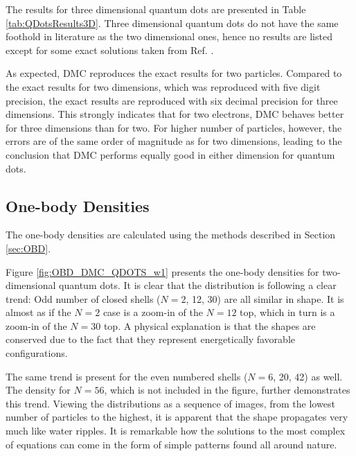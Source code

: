 The results for three dimensional quantum dots are presented in Table \ref{tab:QDotsResults3D}. Three dimensional quantum dots do not have the same foothold in literature as the two dimensional ones, hence no results are listed except for some exact solutions taken from Ref. \cite{taut}. 

As expected, DMC reproduces the exact results for two particles. Compared to the exact results for two dimensions, which was reproduced with five digit precision, the exact results are reproduced with six decimal precision for three dimensions. This strongly indicates that for two electrons, DMC behaves better for three dimensions than for two. For higher number of particles, however, the errors are of the same order of magnitude as for two dimensions, leading to the conclusion that DMC performs equally good in either dimension for quantum dots. 

\subsection{One-body Densities}

The one-body densities are calculated using the methods described in Section \ref{sec:OBD}.

Figure \ref{fig:OBD_DMC_QDOTS_w1} presents the one-body densities for two-dimensional quantum dots. It is clear that the distribution is following a clear trend: Odd number of closed shells ($N=2$, 12, 30) are all similar in shape. It is almost as if the $N=2$ case is a zoom-in of the $N=12$ top, which in turn is a zoom-in of the $N=30$ top. A physical explanation is that the shapes are conserved due to the fact that they represent energetically favorable configurations. 

The same trend is present for the even numbered shells ($N=6$, 20, 42) as well. The density for $N=56$, which is not included in the figure, further demonstrates this trend. Viewing the distributions as a sequence of images, from the lowest number of particles to the highest, it is apparent that the shape propagates very much like water ripples. It is remarkable how the solutions to the most complex of equations can come in the form of simple patterns found all around nature.


